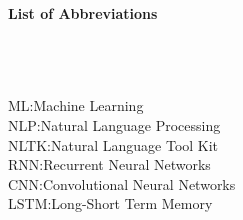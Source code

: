 \begin{huge}
\textbf{List of Abbreviations}
\end{huge}
\\
\\
\\
ML:\hspace*{0.65in}Machine Learning\\
NLP:\hspace*{0.57in}Natural Language Processing\\
NLTK:\hspace*{0.46in}Natural Language Tool Kit\\
RNN:\hspace*{0.55in}Recurrent Neural Networks\\
CNN:\hspace*{0.55in}Convolutional Neural Networks\\
LSTM:\hspace*{0.47in}Long-Short Term Memory\\




